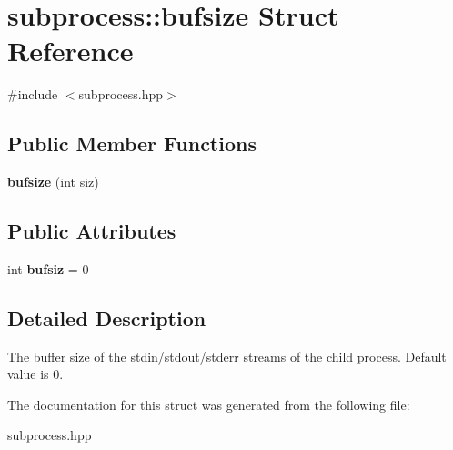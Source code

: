 \hypertarget{structsubprocess_1_1bufsize}{}\section{subprocess\+:\+:bufsize Struct Reference}
\label{structsubprocess_1_1bufsize}


{\ttfamily \#include $<$subprocess.\+hpp$>$}

\subsection*{Public Member Functions}
\begin{DoxyCompactItemize}
\item 
\mbox{\label{structsubprocess_1_1bufsize_af98dd1663b6f37ba5df9a874977c59f2}} 
{\bfseries bufsize} (int siz)
\end{DoxyCompactItemize}
\subsection*{Public Attributes}
\begin{DoxyCompactItemize}
\item 
\mbox{\label{structsubprocess_1_1bufsize_ab7fb1ca1cef24bd402b4bc266c5d4576}} 
int {\bfseries bufsiz} = 0
\end{DoxyCompactItemize}


\subsection{Detailed Description}
The buffer size of the stdin/stdout/stderr streams of the child process. Default value is 0. 

The documentation for this struct was generated from the following file\+:\begin{DoxyCompactItemize}
\item 
subprocess.\+hpp\end{DoxyCompactItemize}
